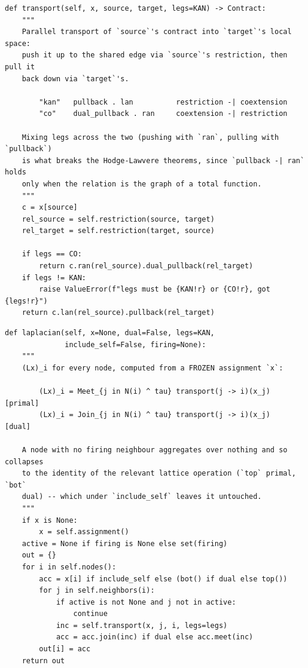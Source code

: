 \documentclass[11pt]{article}
\theoremstyle{definition}
\theoremstyle{remark}
\begin{document}
\begin{lstlisting}[caption={Parallel transport along a chosen adjoint pair. The \texttt{legs}
argument selects a whole pair, so the mismatched pairing of Correction~4 cannot be expressed.}]
def transport(self, x, source, target, legs=KAN) -> Contract:
    """
    Parallel transport of `source`'s contract into `target`'s local space:
    push it up to the shared edge via `source`'s restriction, then pull it
    back down via `target`'s.

        "kan"   pullback . lan          restriction -| coextension
        "co"    dual_pullback . ran     coextension -| restriction

    Mixing legs across the two (pushing with `ran`, pulling with `pullback`)
    is what breaks the Hodge-Lawvere theorems, since `pullback -| ran` holds
    only when the relation is the graph of a total function.
    """
    c = x[source]
    rel_source = self.restriction(source, target)
    rel_target = self.restriction(target, source)

    if legs == CO:
        return c.ran(rel_source).dual_pullback(rel_target)
    if legs != KAN:
        raise ValueError(f"legs must be {KAN!r} or {CO!r}, got {legs!r}")
    return c.lan(rel_source).pullback(rel_target)
\end{lstlisting}

\begin{lstlisting}[caption={The Tarski Laplacian, evaluated against a frozen assignment. The
\texttt{firing} argument is the set $\tau_t$ of broadcasting agents; \texttt{None} fires
everything and recovers the synchronous operator.}]
def laplacian(self, x=None, dual=False, legs=KAN,
              include_self=False, firing=None):
    """
    (Lx)_i for every node, computed from a FROZEN assignment `x`:

        (Lx)_i = Meet_{j in N(i) ^ tau} transport(j -> i)(x_j)   [primal]
        (Lx)_i = Join_{j in N(i) ^ tau} transport(j -> i)(x_j)   [dual]

    A node with no firing neighbour aggregates over nothing and so collapses
    to the identity of the relevant lattice operation (`top` primal, `bot`
    dual) -- which under `include_self` leaves it untouched.
    """
    if x is None:
        x = self.assignment()
    active = None if firing is None else set(firing)
    out = {}
    for i in self.nodes():
        acc = x[i] if include_self else (bot() if dual else top())
        for j in self.neighbors(i):
            if active is not None and j not in active:
                continue
            inc = self.transport(x, j, i, legs=legs)
            acc = acc.join(inc) if dual else acc.meet(inc)
        out[i] = acc
    return out
\end{lstlisting}
\end{document}
